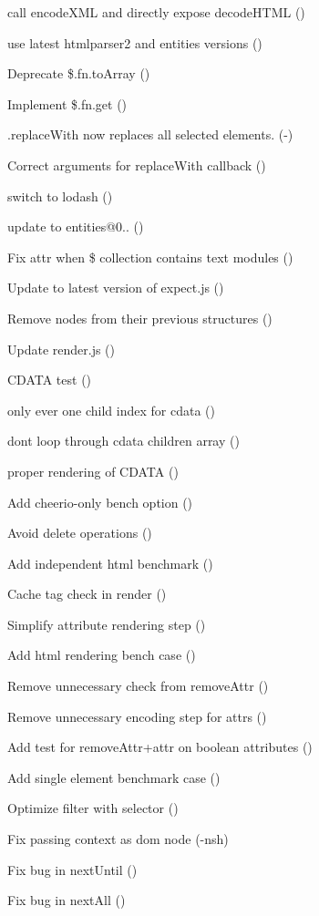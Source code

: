 \begin{DoxyItemize}
\item call encode\+X\+ML and directly expose decode\+H\+T\+ML ()
\item use latest htmlparser2 and entities versions ()
\item Deprecate {\ttfamily \$.fn.\+to\+Array} ()
\item Implement {\ttfamily \$.fn.\+get} ()
\item .replace\+With now replaces all selected elements. (-\/)
\item Correct arguments for \textquotesingle{}replace\+With\textquotesingle{} callback ()
\item switch to lodash ()
\item update to entities@0.. ()
\item Fix attr when \$ collection contains text modules ()
\item Update to latest version of expect.\+js ()
\item Remove nodes from their previous structures ()
\item Update render.\+js ()
\item C\+D\+A\+TA test ()
\item only ever one child index for cdata ()
\item don\textquotesingle{}t loop through cdata children array ()
\item proper rendering of C\+D\+A\+TA ()
\item Add cheerio-\/only bench option ()
\item Avoid delete operations ()
\item Add independent html benchmark ()
\item Cache tag check in render ()
\item Simplify attribute rendering step ()
\item Add html rendering bench case ()
\item Remove unnecessary check from remove\+Attr ()
\item Remove unnecessary encoding step for attrs ()
\item Add test for remove\+Attr+attr on boolean attributes ()
\item Add single element benchmark case ()
\item Optimize filter with selector ()
\item Fix passing context as dom node (-\/nsh)
\item Fix bug in {\ttfamily next\+Until} ()
\item Fix bug in {\ttfamily next\+All} ()

\end{DoxyItemize}
